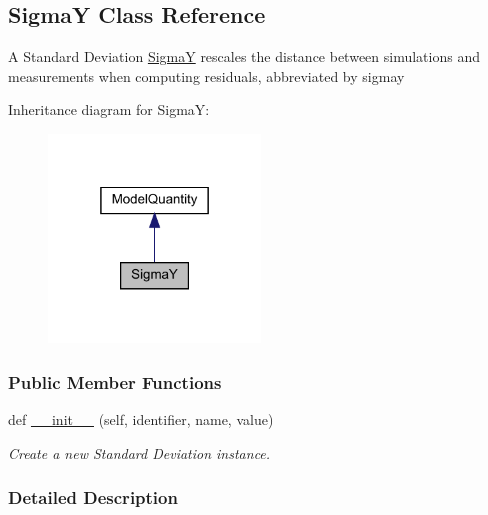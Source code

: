 \hypertarget{classamici_1_1ode__export_1_1_sigma_y}{}\subsection{SigmaY Class Reference}
\label{classamici_1_1ode__export_1_1_sigma_y}


A Standard Deviation \mbox{\hyperlink{classamici_1_1ode__export_1_1_sigma_y}{SigmaY}} rescales the distance between simulations and measurements when computing residuals, abbreviated by {\ttfamily sigmay}  




Inheritance diagram for SigmaY\+:
\nopagebreak
\begin{figure}[H]
\begin{center}
\leavevmode
\includegraphics[width=160pt]{classamici_1_1ode__export_1_1_sigma_y__inherit__graph}
\end{center}
\end{figure}
\subsubsection*{Public Member Functions}
\begin{DoxyCompactItemize}
\item 
def \mbox{\hyperlink{classamici_1_1ode__export_1_1_sigma_y_a258843a3afab00b576ccf386e8673a64}{\+\_\+\+\_\+init\+\_\+\+\_\+}} (self, identifier, name, value)
\begin{DoxyCompactList}\small\item\em Create a new Standard Deviation instance. \end{DoxyCompactList}\end{DoxyCompactItemize}


\subsubsection{Detailed Description}


